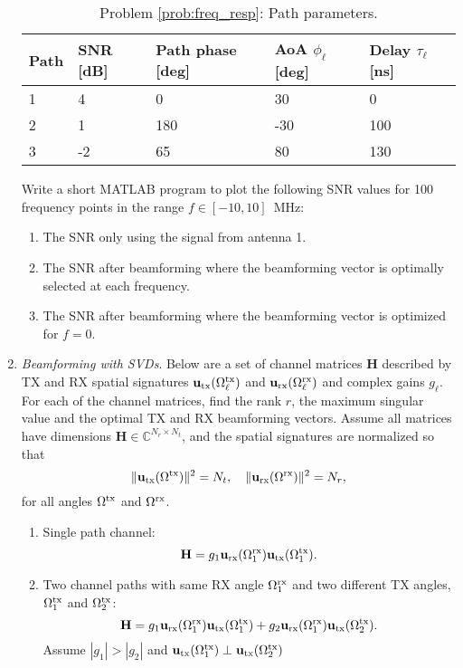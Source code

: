 \documentclass[11pt]{article}
\def\C{{\mathbb{C}}}
\newcommand{\ubf}{\mathbf{u}}
\newcommand{\Hbf}{\mathbf{H}}
\begin{document}
\begin{enumerate}
\begin{table}
\centering
\footnotesize
\begin{tabular}{|l|l|l|l|l|}
\hline
Path & SNR [dB] & Path phase [deg] & AoA $\phi_\ell$ [deg] & Delay $\tau_\ell$ [ns]  \\ \hline
1 & 4 & 0 & 30 & 0 \\ \hline
2 & 1 & 180 & -30 & 100 \\ \hline
3 & -2 & 65 & 80 & 130 \\ \hline
\end{tabular}
\caption{Problem \ref{prob:freq_resp}:  Path parameters.}
\label{tab:freq_resp}
\end{table}

Write a short MATLAB program to plot the following SNR values for 100
frequency points in the range $f \in [-10,10]$\, \si{MHz}:
\begin{enumerate}[label=(\alph*)]
\item The SNR only using the signal from antenna 1.
\item The SNR after beamforming where the beamforming vector is optimally selected at each
frequency.
\item The SNR after beamforming where the beamforming vector is optimized for $f=0$.
\end{enumerate}

\item \emph{Beamforming with SVDs}.  Below are a set of channel matrices $\Hbf$
described by TX and RX spatial signatures $\ubf_{\rm tx}(\Omega^{\rm tx}_\ell)$
and $\ubf_{\rm rx}(\Omega^{\rm rx}_\ell)$ and complex gains
$g_\ell$.
For each of the  channel matrices,
find the rank $r$, the maximum singular value and the optimal TX and RX
beamforming vectors.  Assume all matrices have dimensions
 $\Hbf \in \C^{N_r \times N_t}$,
and the spatial signatures are normalized so that
\[
    \|\ubf_{\rm tx}(\Omega^{\rm tx})\|^2=N_t, \quad
    \|\ubf_{\rm rx}(\Omega^{\rm rx})\|^2=N_r,
\]
for all angles $\Omega^{\rm tx}$ and $\Omega^{\rm rx}$.
\begin{enumerate}[label=(\alph*)]
\item Single path channel:
\[
    \Hbf = g_1
        \ubf_{\rm rx}(\Omega_1^{\rm rx}) \ubf_{\rm tx}(\Omega_1^{\rm tx}).
\]
\item Two channel paths with same RX angle $\Omega_1^{\rm rx}$
and two different TX angles, $\Omega_1^{\rm tx}$ and $\Omega_2^{\rm tx}$:
\[
    \Hbf = g_1
        \ubf_{\rm rx}(\Omega_1^{\rm rx}) \ubf_{\rm tx}(\Omega_1^{\rm tx}) +
        g_2 \ubf_{\rm rx}(\Omega_1^{\rm rx}) \ubf_{\rm tx}(\Omega_2^{\rm tx}).
\]
Assume $|g_1| > |g_2|$ and $\ubf_{\rm tx}(\Omega_1^{\rm tx}) \perp \ubf_{\rm tx}(\Omega_2^{\rm tx})$


\end{enumerate}
\end{enumerate}
\end{document}
